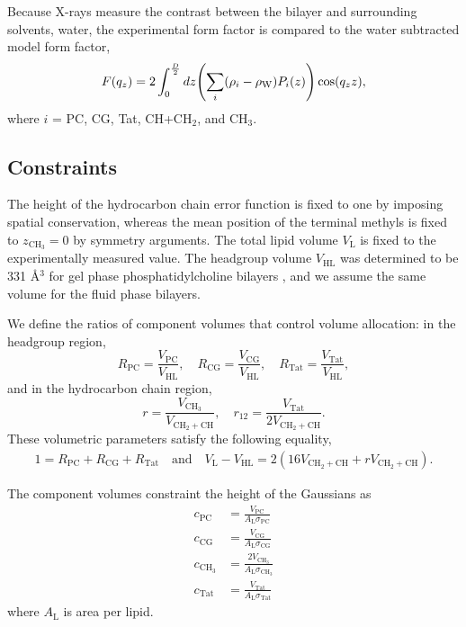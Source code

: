 \documentclass[12pt,letterpaper]{article}
\newcommand{\zCHthree}{z_{\textrm{CH}_3}}
\newcommand{\sigmaPC}{\sigma_\textrm{PC}}
\newcommand{\sigmaCG}{\sigma_\textrm{CG}}
\newcommand{\sigmaCHthree}{\sigma_{\textrm{CH}_3}}
\newcommand{\sigmaTat}{\sigma_\textrm{Tat}}
\newcommand{\cPC}{c_\textrm{PC}}
\newcommand{\cCG}{c_\textrm{CG}}
\newcommand{\cCHthree}{c_{\textrm{CH}_3}}
\newcommand{\cTat}{c_\textrm{Tat}}
\newcommand{\VHL}{V_\textrm{HL}}
\newcommand{\VL}{V_\textrm{L}}
\newcommand{\VTat}{V_\textrm{Tat}}
\newcommand{\VPC}{V_\textrm{PC}}
\newcommand{\VCG}{V_\textrm{CG}}
\newcommand{\VCHtwoCH}{V_{\textrm{CH}_2+\textrm{CH}}}
\newcommand{\VCHthree}{V_{\textrm{CH}_3}}
\newcommand{\RPC}{R_\textrm{PC}}
\newcommand{\RCG}{R_\textrm{CG}}
\newcommand{\RTat}{R_\textrm{Tat}}
\newcommand{\AL}{A_\textrm{L}}
\newcommand{\rhoW}{\rho_\textrm{W}}
\newcommand{\dz}{\mathop{dz}}
\begin{document}
Because X-rays measure the contrast between the bilayer and surrounding solvents, 
water, the experimental form factor is compared to the water subtracted model
form factor,
\begin{equation}
  F(q_z) = 2\int_0^{\frac{D}{2}} \dz \pars{
    \sum_i(\rho_i-\rhoW)P_i(z)
  } \cos(q_zz),
\end{equation}
where $i$ = PC, CG, Tat, CH+CH$_2$, and CH$_3$.

\subsection{Constraints}
The height of the hydrocarbon chain error function is fixed to one by imposing
spatial conservation, whereas the mean position of the terminal methyls is
fixed to $\zCHthree=0$ by symmetry arguments. The total lipid volume
$\VL$ is fixed to the experimentally measured value. 
The headgroup volume $\VHL$ was determined to be 331 \AA$^3$ for 
gel phase phosphatidylcholine bilayers \cite{ref:Tristram-Nagle02},
and we assume the same volume for the fluid phase bilayers.

We define the ratios of component volumes that control volume allocation:
in the headgroup region,
\begin{equation}
  \RPC=\frac{\VPC}{\VHL}, \quad \RCG=\frac{\VCG}{\VHL}, \quad \RTat=\frac{\VTat}{\VHL},
\end{equation}
and in the hydrocarbon chain region, 
\begin{equation}
  r=\frac{\VCHthree}{\VCHtwoCH}, \quad r_{12}=\frac{\VTat}{2\VCHtwoCH}.
\end{equation}
These volumetric parameters satisfy the following equality,
\begin{align}
  1 = \RPC + \RCG + \RTat \quad\text{and}\quad \VL - \VHL = 2\left(16\VCHtwoCH + r\VCHtwoCH\right).
\end{align}

The component volumes constraint the height of the Gaussians as
\begin{align}
  \cPC &= \frac{\VPC}{\AL\sigmaPC} \\
  \cCG &= \frac{\VCG}{\AL\sigmaCG} \\
  \cCHthree &= \frac{2\VCHthree}{\AL\sigmaCHthree} \\
  \cTat &= \frac{\VTat}{\AL\sigmaTat}
\end{align}
where $\AL$ is area per lipid.
\end{document}
